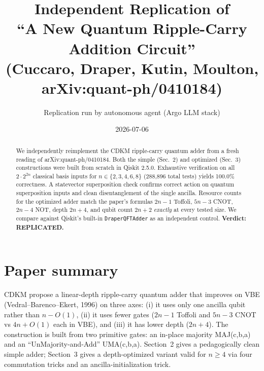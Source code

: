 \documentclass[11pt]{article}
\title{Independent Replication of\\
       ``A New Quantum Ripple-Carry Addition Circuit'' \\
       (Cuccaro, Draper, Kutin, Moulton, arXiv:quant-ph/0410184)}
\author{Replication run by autonomous agent (Argo LLM stack)}
\date{2026-07-06}
\begin{document}
\maketitle

\begin{abstract}
We independently reimplement the CDKM ripple-carry quantum adder from a fresh
reading of arXiv:quant-ph/0410184. Both the simple (Sec.~2) and optimized (Sec.~3)
constructions were built from scratch in Qiskit 2.5.0. Exhaustive verification on
all $2 \cdot 2^{2n}$ classical basis inputs for $n\in\{2,3,4,6,8\}$
(288{,}896 total tests) yields 100.0\% correctness. A statevector superposition
check confirms correct action on quantum superposition inputs and clean
disentanglement of the single ancilla. Resource counts for the optimized adder
match the paper's formulas $2n-1$ Toffoli, $5n-3$ CNOT, $2n-4$ NOT, depth
$2n+4$, and qubit count $2n+2$ \emph{exactly} at every tested size. We compare
against Qiskit's built-in \texttt{DraperQFTAdder} as an independent control.
\textbf{Verdict: REPLICATED.}
\end{abstract}

\section{Paper summary}
CDKM propose a linear-depth ripple-carry quantum adder that improves on VBE
(Vedral–Barenco–Ekert, 1996) on three axes: (i) it uses only one ancilla
qubit rather than $n-O(1)$, (ii) it uses fewer gates ($2n\!-\!1$ Toffoli and
$5n\!-\!3$ CNOT vs $4n\!+\!O(1)$ each in VBE), and (iii) it has lower depth
($2n+4$). The construction is built from two primitive gates: an in-place
majority \textsc{MAJ}(c,b,a) and an ``UnMajority-and-Add'' \textsc{UMA}(c,b,a).
Section~2 gives a pedagogically clean simple adder; Section~3 gives a
depth-optimized variant valid for $n\ge 4$ via four commutation tricks and
an ancilla-initialization trick.
\end{document}
